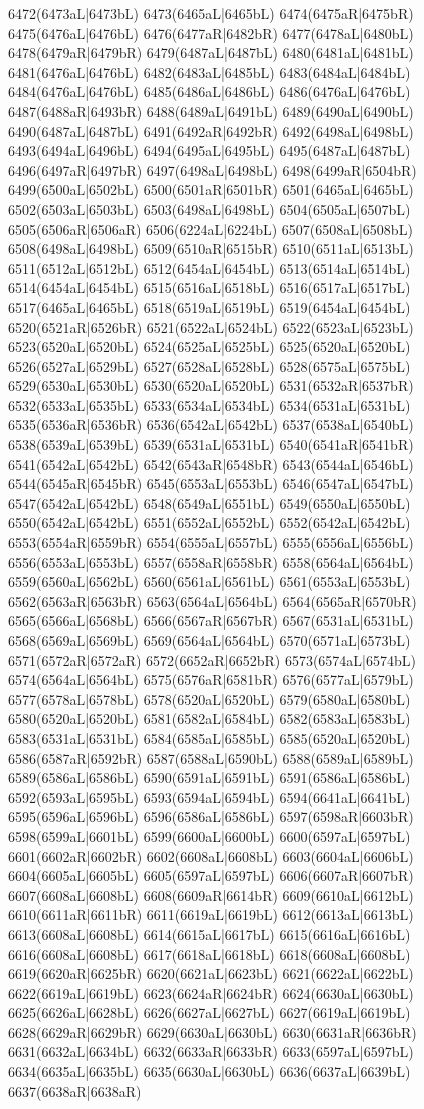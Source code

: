 6472(6473aL|6473bL) 6473(6465aL|6465bL) 6474(6475aR|6475bR) 6475(6476aL|6476bL) 6476(6477aR|6482bR) 6477(6478aL|6480bL) 6478(6479aR|6479bR) 6479(6487aL|6487bL) 6480(6481aL|6481bL) 6481(6476aL|6476bL) 6482(6483aL|6485bL) 6483(6484aL|6484bL) 6484(6476aL|6476bL) 6485(6486aL|6486bL) 6486(6476aL|6476bL) 6487(6488aR|6493bR) 6488(6489aL|6491bL) 6489(6490aL|6490bL) 6490(6487aL|6487bL) 6491(6492aR|6492bR) 6492(6498aL|6498bL) 6493(6494aL|6496bL) 6494(6495aL|6495bL) 6495(6487aL|6487bL) 6496(6497aR|6497bR) 6497(6498aL|6498bL) 6498(6499aR|6504bR) 6499(6500aL|6502bL) 6500(6501aR|6501bR) 6501(6465aL|6465bL) 6502(6503aL|6503bL) 6503(6498aL|6498bL) 6504(6505aL|6507bL) 6505(6506aR|6506aR) 6506(6224aL|6224bL) 6507(6508aL|6508bL) 6508(6498aL|6498bL) 6509(6510aR|6515bR) 6510(6511aL|6513bL) 6511(6512aL|6512bL) 6512(6454aL|6454bL) 6513(6514aL|6514bL) 6514(6454aL|6454bL) 6515(6516aL|6518bL) 6516(6517aL|6517bL) 6517(6465aL|6465bL) 6518(6519aL|6519bL) 6519(6454aL|6454bL) 6520(6521aR|6526bR) 6521(6522aL|6524bL) 6522(6523aL|6523bL) 6523(6520aL|6520bL) 6524(6525aL|6525bL) 6525(6520aL|6520bL) 6526(6527aL|6529bL) 6527(6528aL|6528bL) 6528(6575aL|6575bL) 6529(6530aL|6530bL) 6530(6520aL|6520bL) 6531(6532aR|6537bR) 6532(6533aL|6535bL) 6533(6534aL|6534bL) 6534(6531aL|6531bL) 6535(6536aR|6536bR) 6536(6542aL|6542bL) 6537(6538aL|6540bL) 6538(6539aL|6539bL) 6539(6531aL|6531bL) 6540(6541aR|6541bR) 6541(6542aL|6542bL) 6542(6543aR|6548bR) 6543(6544aL|6546bL) 6544(6545aR|6545bR) 6545(6553aL|6553bL) 6546(6547aL|6547bL) 6547(6542aL|6542bL) 6548(6549aL|6551bL) 6549(6550aL|6550bL) 6550(6542aL|6542bL) 6551(6552aL|6552bL) 6552(6542aL|6542bL) 6553(6554aR|6559bR) 6554(6555aL|6557bL) 6555(6556aL|6556bL) 6556(6553aL|6553bL) 6557(6558aR|6558bR) 6558(6564aL|6564bL) 6559(6560aL|6562bL) 6560(6561aL|6561bL) 6561(6553aL|6553bL) 6562(6563aR|6563bR) 6563(6564aL|6564bL) 6564(6565aR|6570bR) 6565(6566aL|6568bL) 6566(6567aR|6567bR) 6567(6531aL|6531bL) 6568(6569aL|6569bL) 6569(6564aL|6564bL) 6570(6571aL|6573bL) 6571(6572aR|6572aR) 6572(6652aR|6652bR) 6573(6574aL|6574bL) 6574(6564aL|6564bL) 6575(6576aR|6581bR) 6576(6577aL|6579bL) 6577(6578aL|6578bL) 6578(6520aL|6520bL) 6579(6580aL|6580bL) 6580(6520aL|6520bL) 6581(6582aL|6584bL) 6582(6583aL|6583bL) 6583(6531aL|6531bL) 6584(6585aL|6585bL) 6585(6520aL|6520bL) 6586(6587aR|6592bR) 6587(6588aL|6590bL) 6588(6589aL|6589bL) 6589(6586aL|6586bL) 6590(6591aL|6591bL) 6591(6586aL|6586bL) 6592(6593aL|6595bL) 6593(6594aL|6594bL) 6594(6641aL|6641bL) 6595(6596aL|6596bL) 6596(6586aL|6586bL) 6597(6598aR|6603bR) 6598(6599aL|6601bL) 6599(6600aL|6600bL) 6600(6597aL|6597bL) 6601(6602aR|6602bR) 6602(6608aL|6608bL) 6603(6604aL|6606bL) 6604(6605aL|6605bL) 6605(6597aL|6597bL) 6606(6607aR|6607bR) 6607(6608aL|6608bL) 6608(6609aR|6614bR) 6609(6610aL|6612bL) 6610(6611aR|6611bR) 6611(6619aL|6619bL) 6612(6613aL|6613bL) 6613(6608aL|6608bL) 6614(6615aL|6617bL) 6615(6616aL|6616bL) 6616(6608aL|6608bL) 6617(6618aL|6618bL) 6618(6608aL|6608bL) 6619(6620aR|6625bR) 6620(6621aL|6623bL) 6621(6622aL|6622bL) 6622(6619aL|6619bL) 6623(6624aR|6624bR) 6624(6630aL|6630bL) 6625(6626aL|6628bL) 6626(6627aL|6627bL) 6627(6619aL|6619bL) 6628(6629aR|6629bR) 6629(6630aL|6630bL) 6630(6631aR|6636bR) 6631(6632aL|6634bL) 6632(6633aR|6633bR) 6633(6597aL|6597bL) 6634(6635aL|6635bL) 6635(6630aL|6630bL) 6636(6637aL|6639bL) 6637(6638aR|6638aR) 